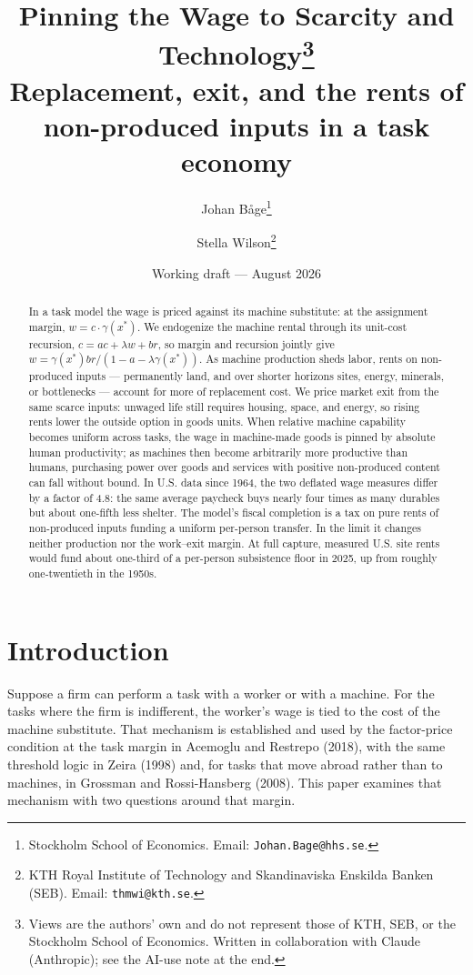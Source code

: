 \documentclass[12pt]{article}
\title{\bfseries Pinning the Wage to Scarcity and Technology\thanks{Views are the
  authors' own and do not represent those of KTH, SEB, or the Stockholm School of
  Economics. Written in collaboration with Claude (Anthropic); see the AI-use note
  at the end.
  }\\[7pt]
  \large\mdseries Replacement, exit, and the rents of non-produced inputs in a task economy}
\author{
  Johan B\r{a}ge\thanks{Stockholm School of Economics.
    Email: \texttt{Johan.Bage@hhs.se}.
  }
  \and
  Stella Wilson\thanks{KTH Royal Institute of Technology and Skandinaviska
    Enskilda Banken (SEB). Email: \texttt{thmwi@kth.se}.}
}
\date{Working draft --- August 2026}
\theoremstyle{plain}
\begin{document}
\maketitle

\begin{abstract}
\noindent In a task model the wage is priced against its machine substitute: at the assignment margin, $w=c\cdot\gamma(x^*)$. We endogenize the machine rental through its unit-cost recursion, $c=ac+\lambda w+br$, so margin and recursion jointly give $w=\gamma(x^*)br/(1-a-\lambda\gamma(x^*))$. As machine production sheds labor, rents on non-produced inputs --- permanently land, and over shorter horizons sites, energy, minerals, or bottlenecks --- account for more of replacement cost. We price market exit from the same scarce inputs: unwaged life still requires housing, space, and energy, so rising rents lower the outside option in goods units. When relative machine capability becomes uniform across tasks, the wage in machine-made goods is pinned by absolute human productivity; as machines then become arbitrarily more productive than humans, purchasing power over goods and services with positive non-produced content can fall without bound. In U.S. data since 1964, the two deflated wage measures differ by a factor of 4.8: the same average paycheck buys nearly four times as many durables but about one-fifth less shelter. The model's fiscal completion is a tax on pure rents of non-produced inputs funding a uniform per-person transfer. In the limit it changes neither production nor the work--exit margin. At full capture, measured U.S. site rents would fund about one-third of a per-person subsistence floor in 2025, up from roughly one-twentieth in the 1950s.
\end{abstract}

\section{Introduction}\label{sec:intro}

Suppose a firm can perform a task with a worker or with a machine. For the tasks where the firm is indifferent, the worker's wage is tied to the cost of the machine substitute. That mechanism is established and used by the factor-price condition at the task margin in Acemoglu and Restrepo (2018), with the same threshold logic in Zeira (1998) and, for tasks that move abroad rather than to machines, in Grossman and Rossi-Hansberg (2008). This paper examines that mechanism with two questions around that margin.
\end{document}
